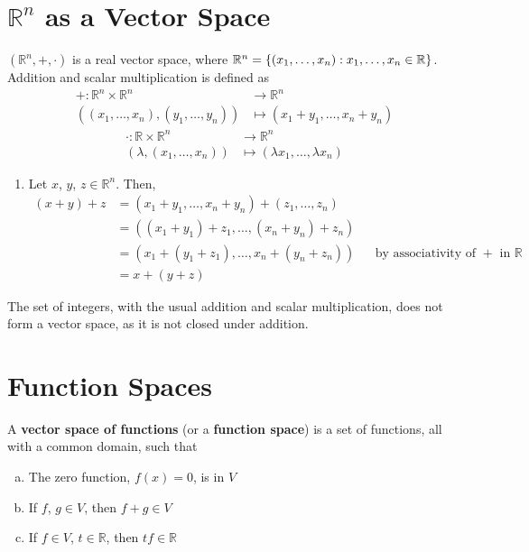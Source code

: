 \documentclass[letterpaper,12pt]{article}
\begin{document}
\section*{$\mathbb{R}^n$ as a Vector Space}
\begin{example}
$(\mathbb{R}^n, +, \cdot)$ is a real vector space, where $\mathbb{R}^n = \left\{ (x_1, \dots, x_n): x_1, \dots, x_n \in \mathbb{R} \right\}$. Addition and scalar multiplication is defined as
\begin{align*}
    + : \mathbb{R}^n \times \mathbb{R}^n & \longrightarrow \mathbb{R}^n \\
    ((x_1, \dots, x_n), (y_1, \dots, y_n)) & \longmapsto (x_1 + y_1, \dots, x_n + y_n)
\end{align*}
\begin{align*}
    \cdot : \mathbb{R} \times \mathbb{R}^n & \longrightarrow \mathbb{R}^n \\
    (\lambda, (x_1, \dots, x_n)) & \longmapsto (\lambda x_1, \dots, \lambda x_n)
\end{align*}
\begin{enumerate}
    \item Let $x$, $y$, $z \in \mathbb{R}^n$. Then,
    \begin{align*}
        (x + y) + z & = (x_1 + y_1, \dots, x_n + y_n) + (z_1, \dots, z_n) \\
        & = ((x_1 + y_1) + z_1, \dots, (x_n + y_n) + z_n) \\
        & = (x_1 + (y_1 + z_1), \dots, x_n + (y_n + z_n)) && \text{by associativity of $+$ in $\mathbb{R}$} \\
        & = x + (y + z)
    \end{align*}
\end{enumerate}
\end{example}


\begin{example}
The set of integers, with the usual addition and scalar multiplication, does not form a vector space, as it is not closed under addition.
\end{example}

\section*{Function Spaces}
\begin{definition}
A \textbf{vector space of functions} (or a \textbf{function space}) is a set of functions, all with a common domain, such that
\begin{enumerate}[(a)]
    \item The zero function, $f(x) = 0$, is in $V$
    \item If $f$, $g \in V$, then $f + g \in V$
    \item If $f \in V$, $t \in \mathbb{R}$, then $tf \in \mathbb{R}$
\end{enumerate}
\end{definition}
\end{document}
